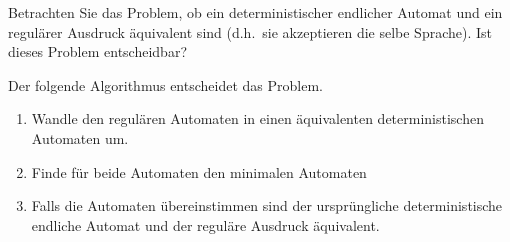 Betrachten Sie das Problem, ob ein deterministischer endlicher Automat
und ein regulärer Ausdruck äquivalent sind (d.h.~sie akzeptieren die
selbe Sprache). Ist dieses Problem entscheidbar?

\begin{loesung}
Der folgende Algorithmus entscheidet das Problem.
\begin{enumerate}
\item Wandle den regulären Automaten in einen äquivalenten deterministischen
Automaten um.
\item Finde für beide Automaten den minimalen Automaten
\item Falls die Automaten übereinstimmen sind der ursprüngliche
deterministische endliche Automat und der reguläre Ausdruck
äquivalent.
\qedhere
\end{enumerate}
\end{loesung}
